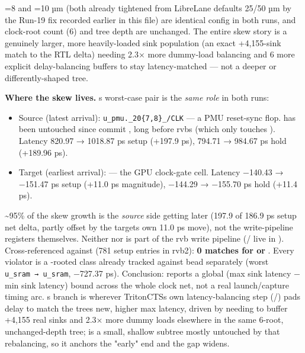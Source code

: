 \begin{record}
{}

=8 and
=10 µm (both already tightened
from LibreLane defaults 25/50 µm by the Run-19  fix
recorded earlier in this file) are identical config in both runs, and
clock-root count (6) and tree depth are unchanged. The entire skew story
is a genuinely larger, more heavily-loaded  sink
population (an exact +4,155-sink match to the RTL delta) needing 2.3×
more dummy-load balancing and 6 more explicit delay-balancing buffers to
stay latency-matched --- not a deeper or differently-shaped tree.

\textbf{Where the skew lives.}
\textquotesingle s worst-case pair is the
\emph{same role} in both runs:

\begin{itemize}
\tightlist
\item
  Source (latest arrival):
  \texttt{u\_\allowbreak{}pmu.\allowbreak{}\_\allowbreak{}20\{7,\allowbreak{}8\}\_\allowbreak{}/\allowbreak{}CLK}
  --- a PMU reset-sync flop.  has been untouched since
  commit , long before rvb\textquotesingle s
   (which only touches ). Latency
  820.97 → 1018.87 ps setup (+197.9 ps), 794.71 → 984.67 ps hold
  (+189.96 ps).
\item
  Target (earliest arrival):  --- the GPU
  clock-gate cell. Latency −140.43 → −151.47 ps setup (+11.0 ps
  magnitude), −144.29 → −155.70 ps hold (+11.4 ps).
\end{itemize}

\textasciitilde95\% of the skew growth is the \emph{source} side getting
later (197.9 of 186.9 ps setup net delta, partly offset by the
target\textquotesingle s own 11.0 ps move), not the write-pipeline
registers themselves. Neither  nor  is part
of the rvb write pipeline (/ live in
). Cross-referenced against
 (781 setup entries in
rvb2): \textbf{0 matches for  or }. Every
violator is a -rooted class already tracked against bead
 separately (worst
\texttt{u\_\allowbreak{}sram\ →\ u\_\allowbreak{}sram}, −727.37 ps).
Conclusion:  reports a global (max sink latency
− min sink latency) bound across the whole clock net, not a real
launch/\allowbreak{}capture timing arc. \textquotesingle s
branch is wherever TritonCTS\textquotesingle s own latency-balancing
step (/) pads delay to match the
tree\textquotesingle s new, higher max latency, driven by needing to
buffer +4,155 real sinks and 2.3× more dummy loads elsewhere in the same
6-root, unchanged-depth tree;  is a small, shallow
subtree mostly untouched by that rebalancing, so it anchors the "early"
end and the gap widens.


\end{record}
